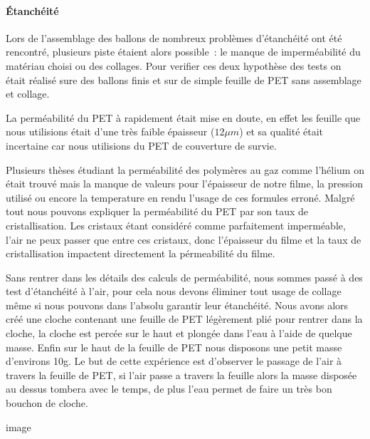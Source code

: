 \documentclass[a4paper,11pt]{article}
\begin{document}
\paragraph{Étanchéité}

Lors de l'assemblage des ballons de nombreux problèmes d'étanchéité ont été rencontré, plusieurs piste étaient alors possible~: le manque de imperméabilité du matériau choisi ou des collages. Pour verifier ces deux hypothèse des tests on était réalisé sure des ballons finis et sur de simple feuille de PET sans assemblage et collage.


La perméabilité du PET à rapidement était mise en doute, en effet les feuille que nous utilisions était d'une très faible épaisseur ($12\mu m$) et sa qualité était incertaine car nous utilisions du PET de couverture de survie.

Plusieurs thèses étudiant la perméabilité des polymères au gaz comme l'hélium on était trouvé mais la manque de valeurs pour l'épaisseur de notre filme, la pression utilisé ou encore la temperature en rendu l'usage de ces formules erroné.
Malgré tout nous pouvons expliquer la perméabilité du PET par son taux de cristallisation. Les cristaux étant considéré comme parfaitement imperméable, l'air ne peux passer que entre ces cristaux, donc l'épaisseur du filme et la taux de cristallisation impactent directement la pérmeabilité du filme.

Sans rentrer dans les détails des calculs de perméabilité, nous sommes passé à des test d'étanchéité à l'air, pour cela nous devons éliminer tout usage de collage même si nous pouvons dans l'absolu garantir leur étanchéité.
Nous avons alors créé une cloche contenant une feuille de PET légèrement plié pour rentrer dans la cloche, la cloche est percée sur le haut et plongée dans l'eau à l'aide de quelque masse. Enfin sur le haut de la feuille de PET nous disposons une petit masse d'environs 10g.
Le but de cette expérience est d'observer le passage de l'air à travers la feuille de PET, si l'air passe a travers la feuille alors la masse disposée au dessus tombera avec le temps, de plus l'eau permet de faire un très bon bouchon de cloche.

\begin{center}
  image
\end{center}
\end{document}

